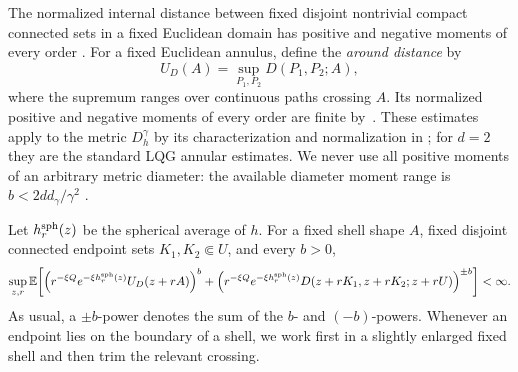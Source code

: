 \documentclass[11pt,reqno]{amsart}
\theoremstyle{plain}
\theoremstyle{definition}
\theoremstyle{remark}
\newcommand{\E}{\mathbb E}
\newcommand{\1}{\mathbf{1}}
\begin{document}
The normalized internal distance between fixed disjoint nontrivial compact connected sets in a fixed Euclidean domain has positive and negative moments of every order \cite[Proposition 4.7]{CHZ}. For a fixed Euclidean annulus, define the \emph{around distance} by
\begin{equation}\label{eq:around}
U_D(A)=\sup_{P_1,P_2}D(P_1,P_2;A),
\end{equation}
where the supremum ranges over continuous paths crossing $A$. Its normalized positive and negative moments of every order are finite by~\cite[Proposition 4.10]{CHZ}. These estimates apply to the metric $D_h^\gamma$ by its characterization and normalization in \cite{Bonanno}; for $d=2$ they are the standard LQG annular estimates. We never use all positive moments of an arbitrary metric diameter: the available diameter moment range is $b<2dd_\gamma/\gamma^2$ \cite[Proposition 4.11]{CHZ}.

Let $h_r^{\rm sph}(z)$ be the spherical average of $h$. For a fixed shell shape $A$, fixed disjoint connected endpoint sets $K_1,K_2\Subset U$, and every $b>0$,
\begin{equation}\label{eq:basic-moments}
\sup_{z,r}\E\!\left[\left(r^{-\xi Q}e^{-\xi h_r^{\rm sph}(z)}U_D(z+rA)\right)^b
+\left(r^{-\xi Q}e^{-\xi h_r^{\rm sph}(z)}D(z+rK_1,z+rK_2;z+rU)\right)^{\pm b}\right]<\infty.
\end{equation}
As usual, a $\pm b$-power denotes the sum of the $b$- and $(-b)$-powers. Whenever an endpoint lies on the boundary of a shell, we work first in a slightly enlarged fixed shell and then trim the relevant crossing.
\end{document}
